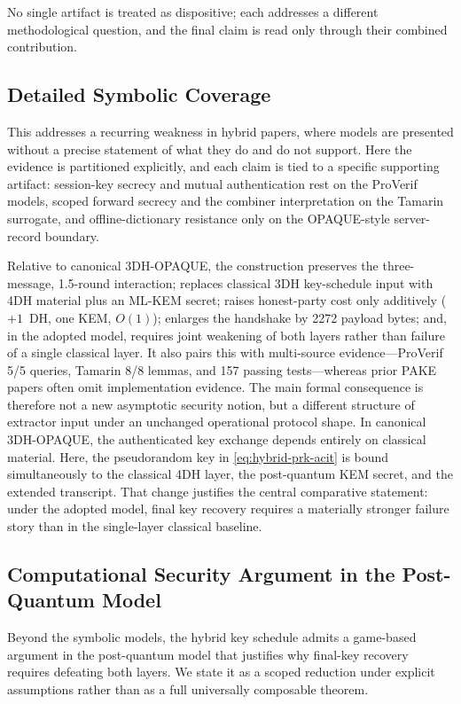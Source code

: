 \documentclass[conference]{IEEEtran}
\begin{document}
No single artifact is treated as dispositive; each addresses a different methodological question, and the final claim is read only through their combined contribution.

\subsection{Detailed Symbolic Coverage}


This addresses a recurring weakness in hybrid papers, where models are presented without a precise statement of what they do and do not support. Here the evidence is partitioned explicitly, and each claim is tied to a specific supporting artifact: session-key secrecy and mutual authentication rest on the ProVerif models, scoped forward secrecy and the combiner interpretation on the Tamarin surrogate, and offline-dictionary resistance only on the OPAQUE-style server-record boundary.

Relative to canonical 3DH-OPAQUE, the construction preserves the three-message, 1.5-round interaction; replaces classical 3DH key-schedule input with 4DH material plus an ML-KEM secret; raises honest-party cost only additively ($+1$~DH, one KEM, $O(1)$); enlarges the handshake by 2272 payload bytes; and, in the adopted model, requires joint weakening of both layers rather than failure of a single classical layer. It also pairs this with multi-source evidence---ProVerif 5/5 queries, Tamarin 8/8 lemmas, and 157 passing tests---whereas prior PAKE papers often omit implementation evidence. The main formal consequence is therefore not a new asymptotic security notion, but a different structure of extractor input under an unchanged operational protocol shape. In canonical 3DH-OPAQUE, the authenticated key exchange depends entirely on classical material. Here, the pseudorandom key in \eqref{eq:hybrid-prk-acit} is bound simultaneously to the classical 4DH layer, the post-quantum KEM secret, and the extended transcript. That change justifies the central comparative statement: under the adopted model, final key recovery requires a materially stronger failure story than in the single-layer classical baseline.

\subsection{\color{blue}Computational Security Argument in the Post-Quantum Model}

\begingroup\color{blue}
Beyond the symbolic models, the hybrid key schedule admits a game-based argument in the post-quantum model that justifies why final-key recovery requires defeating both layers. We state it as a scoped reduction under explicit assumptions rather than as a full universally composable theorem.
\end{document}

